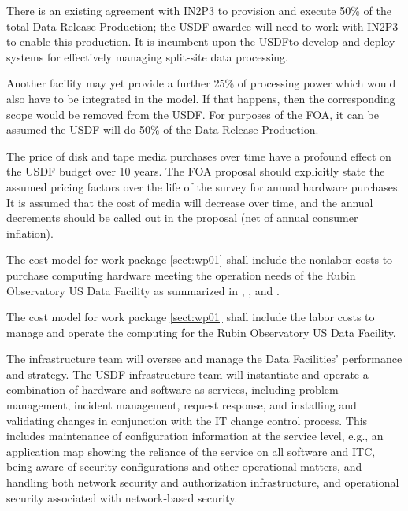 There is an existing agreement with IN2P3  to provision and execute 50\% of the total Data Release Production; the \gls{USDF} awardee will need to work with IN2P3 to enable this production.
It is incumbent upon the \gls{USDF}to develop and deploy systems for effectively managing split-site data processing.

Another facility may yet provide a further 25\% of processing power which would also have to be integrated in the model. If that happens, then the corresponding scope would be removed from the \gls{USDF}. For purposes of the \gls{FOA}, it can be assumed the \gls{USDF} will do 50\% of the Data Release Production.

The price of disk and tape media purchases over time have a profound effect on the \gls{USDF} budget over 10 years.
The FOA proposal should explicitly state the assumed pricing factors over the life of the survey for annual hardware purchases. It is assumed that the cost of media will decrease over time, and the annual decrements should be called out in the proposal (net of annual consumer inflation).






\reqsimp{}{}{}{}{}
{
The cost model for work package \ref{sect:wp01} shall include the nonlabor
costs to purchase computing hardware meeting the operation needs of the Rubin Observatory \gls{US} Data Facility as summarized in , , and .
}

\reqsimp{}{}{}{}{}
{
The cost model for work package \ref{sect:wp01} shall include the labor costs to
manage and operate the computing for the  Rubin Observatory \gls{US} Data Facility.
}

The infrastructure team will oversee and manage the Data Facilities'
performance and strategy. The \gls{USDF} infrastructure team will
instantiate and operate a combination of hardware and software as
services, including problem management, incident management, request
response, and installing and validating changes in conjunction with
the IT change control process. This includes maintenance of
configuration information at the service level, e.g., an application
map showing the reliance of the service on all software and ITC, being
aware of security configurations and other operational matters, and
handling both network security and authorization infrastructure, and
operational security associated with network-based security.

